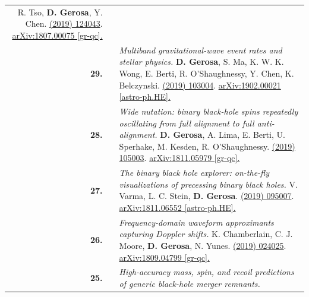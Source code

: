 {\begin{longtable}{rp{0.3cm}p{15.8cm}}
\newline{}
R. Tso, \textbf{D. Gerosa}, Y. Chen.
\newline{}
\href{https://journals.aps.org/prd/abstract/10.1103/PhysRevD.99.124043}{\prd 99 (2019) 124043}. \href{https://arxiv.org/abs/1807.00075}{arXiv:1807.00075 [gr-qc].}
\vspace{0.09cm}\\
%
\textbf{29.} & & \textit{Multiband gravitational-wave event rates and stellar physics.}
\newline{}
\textbf{D. Gerosa}, S. Ma, K. W. K. Wong, E. Berti, R. O'Shaughnessy, Y. Chen, K. Belczynski.
\newline{}
\href{https://journals.aps.org/prd/abstract/10.1103/PhysRevD.99.103004}{\prd 99 (2019) 103004}. \href{https://arxiv.org/abs/1902.00021}{arXiv:1902.00021 [astro-ph.HE].}
\vspace{0.09cm}\\
%
\textbf{28.} & & \textit{Wide nutation: binary black-hole spins repeatedly oscillating from full alignment to full anti-alignment.}
\newline{}
\textbf{D. Gerosa}, A. Lima, E. Berti, U. Sperhake, M. Kesden, R. O'Shaughnessy.
\newline{}
\href{https://iopscience.iop.org/article/10.1088/1361-6382/ab14ae/meta}{\cqg 36 (2019) 105003}. \href{https://arxiv.org/abs/1811.05979}{arXiv:1811.05979 [gr-qc].}
\vspace{0.09cm}\\
%
\textbf{27.} & & \textit{The binary black hole explorer: on-the-fly visualizations of precessing binary black holes.}
\newline{}
V. Varma, L. C. Stein, \textbf{D. Gerosa}.
\newline{}
\href{https://iopscience.iop.org/article/10.1088/1361-6382/ab0ee9/meta}{\cqg 36 (2019) 095007}. \href{https://arxiv.org/abs/1811.06552}{arXiv:1811.06552 [astro-ph.HE].}
\vspace{0.09cm}\\
%
\textbf{26.} & & \textit{Frequency-domain waveform approximants capturing Doppler shifts.}
\newline{}
K. Chamberlain, C. J. Moore, \textbf{D. Gerosa}, N. Yunes.
\newline{}
\href{https://journals.aps.org/prd/abstract/10.1103/PhysRevD.99.024025}{\prd 99 (2019) 024025}. \href{https://arxiv.org/abs/1809.04799}{arXiv:1809.04799 [gr-qc].}
\vspace{0.09cm}\\
%
\textbf{25.} & & \textit{High-accuracy mass, spin, and recoil predictions of generic black-hole merger remnants.}

\end{longtable}}
